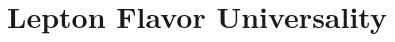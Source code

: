 \documentclass[../Elad_Kliger_Thesis.tex]{subfiles}
\begin{document}
\section{Lepton Flavor Universality}
\end{document}
